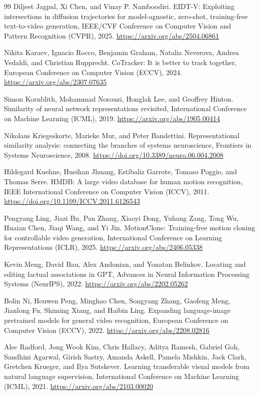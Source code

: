 \documentclass[twoside,english]{article}
\begin{document}
\begin{thebibliography}{99}
 Diljeet Jagpal, Xi Chen, and Vinay P. Namboodiri. EIDT-V: Exploiting intersections in diffusion trajectories for model-agnostic, zero-shot, training-free text-to-video generation, IEEE/CVF Conference on Computer Vision and Pattern Recognition (CVPR), 2025. \url{https://arxiv.org/abs/2504.06861}

 Nikita Karaev, Ignacio Rocco, Benjamin Graham, Natalia Neverova, Andrea Vedaldi, and Christian Rupprecht. CoTracker: It is better to track together, European Conference on Computer Vision (ECCV), 2024. \url{https://arxiv.org/abs/2307.07635}

 Simon Kornblith, Mohammad Norouzi, Honglak Lee, and Geoffrey Hinton. Similarity of neural network representations revisited, International Conference on Machine Learning (ICML), 2019. \url{https://arxiv.org/abs/1905.00414}

 Nikolaus Kriegeskorte, Marieke Mur, and Peter Bandettini. Representational similarity analysis: connecting the branches of systems neuroscience, Frontiers in Systems Neuroscience, 2008. \url{https://doi.org/10.3389/neuro.06.004.2008}

 Hildegard Kuehne, Hueihan Jhuang, Est\'ibaliz Garrote, Tomaso Poggio, and Thomas Serre. HMDB: A large video database for human motion recognition, IEEE International Conference on Computer Vision (ICCV), 2011. \url{https://doi.org/10.1109/ICCV.2011.6126543}

 Pengyang Ling, Jiazi Bu, Pan Zhang, Xiaoyi Dong, Yuhang Zang, Tong Wu, Huaian Chen, Jiaqi Wang, and Yi Jin. MotionClone: Training-free motion cloning for controllable video generation, International Conference on Learning Representations (ICLR), 2025. \url{https://arxiv.org/abs/2406.05338}

 Kevin Meng, David Bau, Alex Andonian, and Yonatan Belinkov. Locating and editing factual associations in GPT, Advances in Neural Information Processing Systems (NeurIPS), 2022. \url{https://arxiv.org/abs/2202.05262}

 Bolin Ni, Houwen Peng, Minghao Chen, Songyang Zhang, Gaofeng Meng, Jianlong Fu, Shiming Xiang, and Haibin Ling. Expanding language-image pretrained models for general video recognition, European Conference on Computer Vision (ECCV), 2022. \url{https://arxiv.org/abs/2208.02816}

 Alec Radford, Jong Wook Kim, Chris Hallacy, Aditya Ramesh, Gabriel Goh, Sandhini Agarwal, Girish Sastry, Amanda Askell, Pamela Mishkin, Jack Clark, Gretchen Krueger, and Ilya Sutskever. Learning transferable visual models from natural language supervision, International Conference on Machine Learning (ICML), 2021. \url{https://arxiv.org/abs/2103.00020}


\end{thebibliography}
\end{document}
